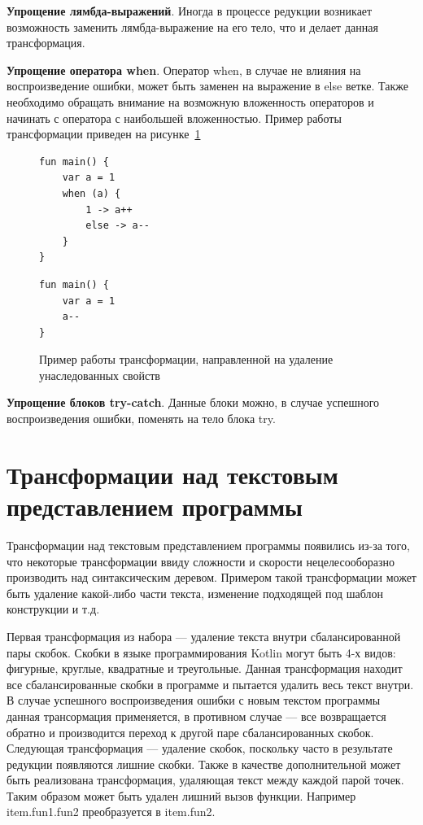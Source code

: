 \textbf{Упрощение лямбда-выражений}. Иногда в процессе редукции возникает возможность заменить лямбда-выражение на его тело, что и делает данная трансформация. 

\textbf{Упрощение оператора when}. Оператор when, в случае не влияния на воспроизведение ошибки, может быть заменен на выражение в else ветке. Также необходимо обращать внимание на возможную вложенность операторов и начинать с оператора с наибольшей вложенностью. Пример работы трансформации приведен на рисунке~\ref{ex:when}
\begin{figure}
\begin{lstlisting}
fun main() {
    var a = 1
    when (a) {
        1 -> a++
        else -> a--
    }
}
\end{lstlisting}
\begin{lstlisting}
fun main() {
    var a = 1
    a--
}
\end{lstlisting}
\caption{\label{ex:when}Пример работы трансформации, направленной на удаление унаследованных свойств}
\end{figure}

\textbf{Упрощение блоков try-catch}. Данные блоки можно, в случае успешного воспроизведения ошибки, поменять на тело блока try.


\section{Трансформации над текстовым представлением программы}
Трансформации над текстовым представлением программы появились из-за того, что некоторые трансформации ввиду сложности и скорости нецелесооборазно производить над синтаксическим деревом. Примером такой трансформации может быть удаление какой-либо части текста, изменение подходящей под шаблон конструкции и т.д.

Первая трансформация из набора --- удаление текста внутри сбалансированной пары скобок. Скобки в языке программирования Kotlin могут быть 4-х видов: фигурные, круглые, квадратные и треугольные. Данная трансформация находит все сбалансированные скобки в программе и пытается удалить весь текст внутри. В случае успешного воспроизведения ошибки с новым текстом программы данная трансормация применяется, в противном случае --- все возвращается обратно и производится переход к другой паре сбалансированных скобок. Следующая трансформация --- удаление скобок, поскольку часто в результате редукции появляются лишние скобки. Также в качестве дополнительной может быть реализована трансформация, удаляющая текст между каждой парой точек. Таким образом может быть удален лишний вызов функции. Например item.fun1.fun2 преобразуется в item.fun2.

